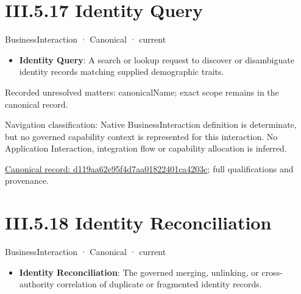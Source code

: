 \section*{III.5.17 Identity Query}
\label{navigation:III.5.17}

\label{element:d119aa62e95f4d7aa01822401ca4203c}
{\small BusinessInteraction · Canonical · current}\par

\begin{itemize}


\item \textbf{Identity Query}: A search or lookup request to discover or disambiguate identity records matching supplied demographic traits.

\end{itemize}

{\small Recorded unresolved matters: canonicalName; exact scope remains in the canonical record.}\par
{\small Navigation classification: Native BusinessInteraction definition is determinate, but no governed capability context is represented for this interaction. No Application Interaction, integration flow or capability allocation is inferred.}\par
{\footnotesize \href{../../../../../../../../continuum/business/business-interaction/d119aa62e95f4d7aa01822401ca4203c.md}{Canonical record: d119aa62e95f4d7aa01822401ca4203c}; full qualifications and provenance.}\par
\section*{III.5.18 Identity Reconciliation}
\label{navigation:III.5.18}

\label{element:332cdc30ae0346c6b86233db71caf683}
{\small BusinessInteraction · Canonical · current}\par

\begin{itemize}


\item \textbf{Identity Reconciliation}: The governed merging, unlinking, or cross-authority correlation of duplicate or fragmented identity records.

\end{itemize}

